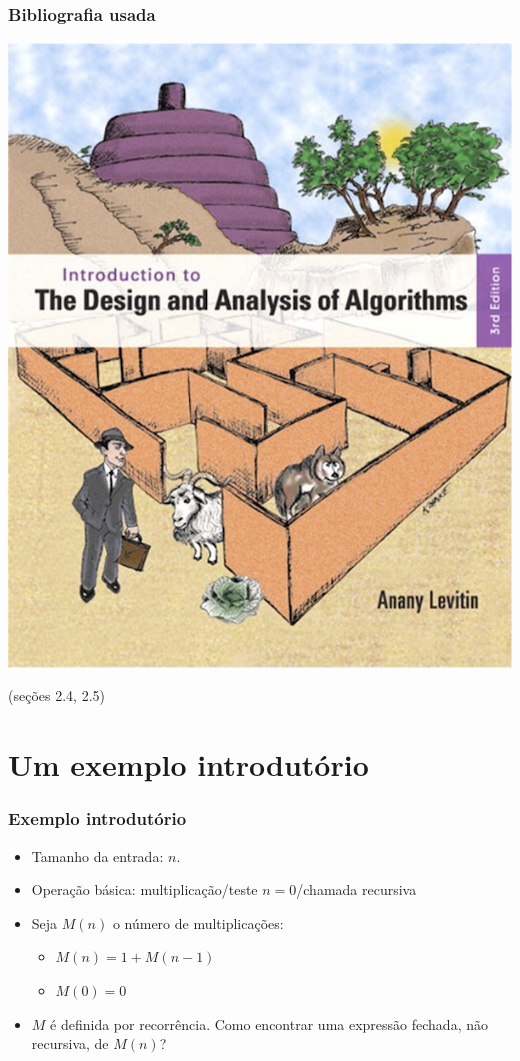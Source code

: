 \documentclass[handout]{beamer}
\begin{document}
\begin{frame}

  \frametitle{Bibliografia usada}

  \begin{center}
    \includegraphics[height=.8\textheight]{img/capa-levitin.jpg}
  \end{center}
  (seções 2.4, 2.5)
\end{frame}

\section{Um exemplo introdutório}

\begin{frame}
  \frametitle{Exemplo introdutório}

  \begin{example}[Fatorial]
    
  \end{example}
  \pause

\begin{itemize}
\item Tamanho da entrada: $n$.
\item Operação básica: \alert{multiplicação}/teste $n=0$/chamada recursiva
\item Seja $M(n)$ o número de multiplicações:
\begin{itemize}
\item $M(n) = 1 + M(n-1)$
\item $M(0) = 0$
\end{itemize}
\item $M$ é definida por recorrência. Como encontrar uma expressão fechada,
não recursiva, de $M(n)$?
\end{itemize}
\end{frame}
\end{document}
